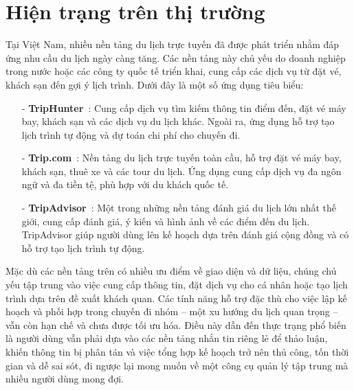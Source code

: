 \section{Hiện trạng trên thị trường}
Tại Việt Nam, nhiều nền tảng du lịch trực tuyến đã được phát triển nhằm đáp ứng nhu cầu du lịch ngày càng tăng. Các nền tảng này chủ yếu do doanh nghiệp trong nước hoặc các công ty quốc tế triển khai, cung cấp các dịch vụ từ đặt vé, khách sạn đến gợi ý lịch trình. Dưới đây là một số ứng dụng tiêu biểu:

\begin{itemize}
    \item[-]\textbf{TripHunter}~\cite{triphunter}: Cung cấp dịch vụ tìm kiếm thông tin điểm đến, đặt vé máy bay, khách sạn và các dịch vụ du lịch khác. Ngoài ra, ứng dụng hỗ trợ tạo lịch trình tự động và dự toán chi phí cho chuyến đi.

    \item[-]\textbf{Trip.com}~\cite{tripcom}: Nền tảng du lịch trực tuyến toàn cầu, hỗ trợ đặt vé máy bay, khách sạn, thuê xe và các tour du lịch. Ứng dụng cung cấp dịch vụ đa ngôn ngữ và đa tiền tệ, phù hợp với du khách quốc tế.

    \item[-]\textbf{TripAdvisor}~\cite{tripadvisor}: Một trong những nền tảng đánh giá du lịch lớn nhất thế giới, cung cấp đánh giá, ý kiến và hình ảnh về các điểm đến du lịch. TripAdvisor giúp người dùng lên kế hoạch dựa trên đánh giá cộng đồng và có hỗ trợ tạo lịch trình tự động.


\end{itemize}

Mặc dù các nền tảng trên có nhiều ưu điểm về giao diện và dữ liệu, chúng chủ yếu tập trung vào việc cung cấp thông tin, đặt dịch vụ cho cá nhân hoặc tạo lịch trình dựa trên đề xuất khách quan. Các tính năng hỗ trợ đặc thù cho việc lập kế hoạch và phối hợp trong chuyến đi nhóm – một xu hướng du lịch quan trọng – vẫn còn hạn chế và chưa được tối ưu hóa. Điều này dẫn đến thực trạng phổ biến là người dùng vẫn phải dựa vào các nền tảng nhắn tin riêng lẻ để thảo luận, khiến thông tin bị phân tán và việc tổng hợp kế hoạch trở nên thủ công, tốn thời gian và dễ sai sót, đi ngược lại mong muốn về một công cụ quản lý tập trung mà nhiều người dùng mong đợi. %

